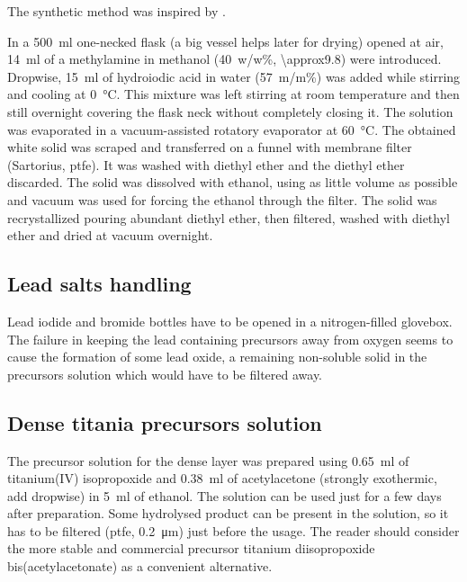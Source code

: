 		
		The synthetic method was inspired by \cite{Im2011a, Aharon2014, Williams2014, Etgar2012a, Nagaoka2015}.
		
		In a \SI{500}{\ml} one-necked flask (a big vessel helps later for drying) opened at air, \SI{14}{\ml} of a methylamine in methanol (40~w/w\%, \SI{\approx9.8}{\Molar}) were introduced. Dropwise, \SI{15}{\ml} of hydroiodic acid in water (57~m/m\%) was added while stirring and cooling at \SI{0}{\celsius}. This mixture was left stirring at room temperature and then still overnight covering the flask neck without completely closing it.
		The solution was evaporated in a vacuum-assisted rotatory evaporator at \SI{60}{\celsius}.
		The obtained white solid was scraped and transferred on a funnel with membrane filter (Sartorius, \gls{ptfe}). It was washed with diethyl ether and the diethyl ether discarded. The solid was dissolved with ethanol, using as little volume as possible and vacuum was used for forcing the ethanol through the filter. The solid was recrystallized pouring abundant diethyl ether, then filtered, washed with diethyl ether and dried at vacuum overnight.

	\subsection{Lead salts handling}
		
		 Lead iodide and bromide bottles have to be opened in a nitrogen-filled glovebox. The failure in keeping the lead containing precursors away from oxygen seems to cause the formation of some lead oxide, a remaining non-soluble solid in the precursors solution which would have to be filtered away.
		 
	\subsection{Dense titania precursors solution}\label{precursors_tio2}
		
		The precursor solution for the dense \TiOtwo layer was prepared using \SI{0.65}{\ml} of titanium(IV) isopropoxide and \SI{0.38}{\ml} of acetylacetone (strongly exothermic, add dropwise) in \SI{5}{\ml} of ethanol. The solution can be used just for a few days after preparation. Some hydrolysed product can be present in the solution, so it has to be filtered (\gls{ptfe}, \SI{0.2}{\um}) just before the usage. The reader should consider the more stable and commercial precursor titanium diisopropoxide bis(acetylacetonate) as a convenient alternative.
		
